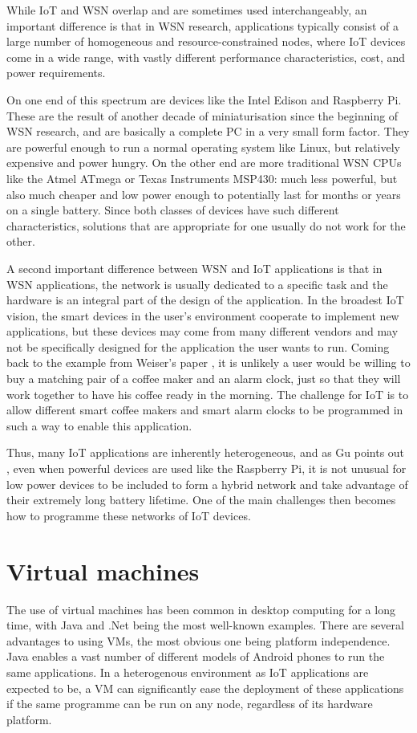 While IoT and WSN overlap and are sometimes used interchangeably, an important difference is that in WSN research, applications typically consist of a large number of homogeneous and resource-constrained nodes, where IoT devices come in a wide range, with vastly different performance characteristics, cost, and power requirements.

On one end of this spectrum are devices like the Intel Edison and Raspberry Pi. These are the result of another decade of miniaturisation since the beginning of WSN research, and are basically a complete PC in a very small form factor. They are powerful enough to run a normal operating system like Linux, but relatively expensive and power hungry. On the other end are more traditional WSN CPUs like the Atmel ATmega or Texas Instruments MSP430: much less powerful, but also much cheaper and low power enough to potentially last for months or years on a single battery. Since both classes of devices have such different characteristics, solutions that are appropriate for one usually do not work for the other.

A second important difference between WSN and IoT applications is that in WSN applications, the network is usually dedicated to a specific task and the hardware is an integral part of the design of the application. In the broadest IoT vision, the smart devices in the user's environment cooperate to implement new applications, but these devices may come from many different vendors and may not be specifically designed for the application the user wants to run. Coming back to the example from Weiser's paper \cite{Weiser:1991wz}, it is unlikely a user would be willing to buy a matching pair of a coffee maker and an alarm clock, just so that they will work together to have his coffee ready in the morning. The challenge for IoT is to allow different smart coffee makers and smart alarm clocks to be programmed in such a way to enable this application.

Thus, many IoT applications are inherently heterogeneous, and as Gu points out \cite{Gu:2006ww}, even when powerful devices are used like the Raspberry Pi, it is not unusual for low power devices to be included to form a hybrid network and take advantage of their extremely long battery lifetime. One of the main challenges then becomes how to programme these networks of IoT devices.



\section{Virtual machines}
The use of virtual machines has been common in desktop computing for a long time, with Java and .Net being the most well-known examples. There are several advantages to using VMs, the most obvious one being platform independence. Java enables a vast number of different models of Android phones to run the same applications. In a heterogenous environment as IoT applications are expected to be, a VM can significantly ease the deployment of these applications if the same programme can be run on any node, regardless of its hardware platform.

